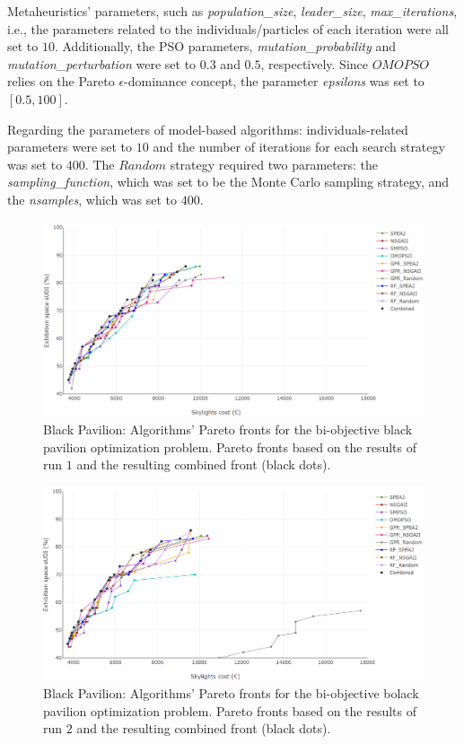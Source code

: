 Metaheuristics' parameters, such as \textit{population\_size}, \textit{leader\_size}, \textit{max\_iterations}, i.e., the parameters related to the individuals/particles of each iteration were all set to $10$. Additionally, the \ac{PSO} parameters, \textit{mutation\_probability} and \textit{mutation\_perturbation} were set to $0.3$ and $0.5$, respectively. Since $OMOPSO$ relies on the Pareto $\epsilon$-dominance concept, the parameter \textit{epsilons} was set to $[0.5, 100]$.

Regarding the parameters of model-based algorithms: individuals-related parameters were set to $10$ and the number of iterations for each search strategy was set to $400$. The $Random$ strategy required two parameters: the \textit{sampling\_function}, which was set to be the Monte Carlo sampling strategy, and the \textit{nsamples}, which was set to $400$.

\begin{figure}[h!]
	\centering
	\includegraphics[width=\textwidth]{Images/Evaluation/BlackPavilion/All_Algorithms_run1-2019-04-19.png}
	\caption[Black Pavilion: Pareto Fronts for run 1]{Black Pavilion: Algorithms' Pareto fronts for the bi-objective black pavilion optimization problem. Pareto fronts based on the results of run $1$ and the resulting combined front (black dots).}
	\label{table:blackpavilionrun1}
\end{figure}

\begin{figure}[h!]
	\centering
	\includegraphics[width=\textwidth]{Images/Evaluation/BlackPavilion/All_Algorithms_run2-2019-04-19.png}
	\caption[Black Pavilion: Pareto Fronts for run 2]{Black Pavilion: Algorithms' Pareto fronts for the bi-objective bolack pavilion optimization problem. Pareto fronts based on the results of run $2$ and the resulting combined front (black dots).}
	\label{table:blackpavilionrun2}
\end{figure}

